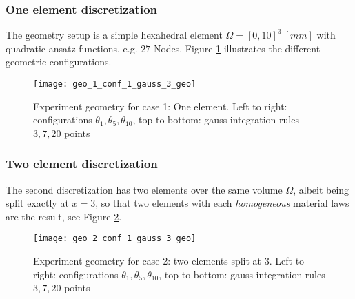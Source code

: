 \subsubsection{One element discretization}
The geometry setup is a simple hexahedral element $\Omega = [0,10]^3~[mm]$ with quadratic ansatz functions, e.g. $27$ Nodes.
Figure \ref{fig:geo1} illustrates the different geometric configurations.
\begin{figure}[!ht]
	\texttt{[image: geo\_1\_conf\_1\_gauss\_3\_geo]}
	\caption{Experiment geometry for case 1: One element. 
	Left to right: configurations $\theta_1,\theta_5,\theta_{10}$, top to bottom: gauss integration rules $3,7,20$ points}
	\label{fig:geo1}
\end{figure}
\subsubsection{Two element discretization}
The second discretization has two elements over the same volume $\Omega$, albeit being split exactly at $x=3$, so that two elements
with each \textit{homogeneous} material laws are the result, see Figure \ref{fig:geo2}.
\begin{figure}[!ht]
	\texttt{[image: geo\_2\_conf\_1\_gauss\_3\_geo]}
	\caption{Experiment geometry for case 2: two elements split at $3$.
	Left to right: configurations $\theta_1,\theta_5,\theta_{10}$, top to bottom: gauss integration rules $3,7,20$ points}
	\label{fig:geo2}
\end{figure}

